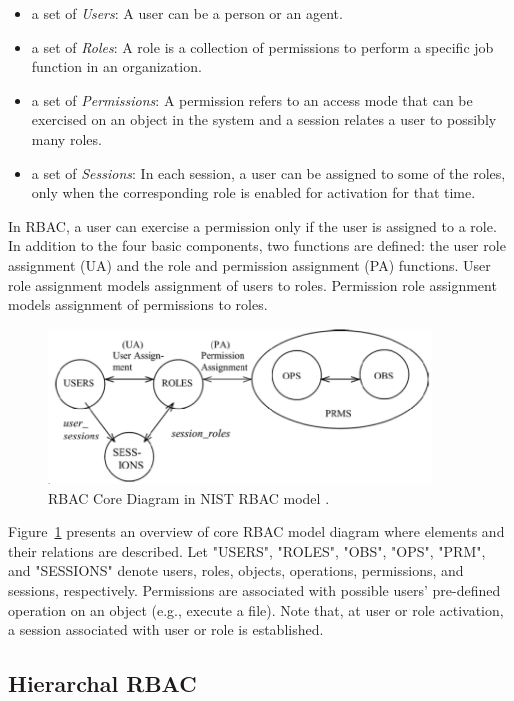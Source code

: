 \begin{itemize}
\setlength{\itemsep}{0.25pt}
\item a set of \emph{Users}: A user can be a person or an agent.
\item a set of \emph{Roles}: A role is a collection of permissions to perform a specific job function in an organization.
\item a set of \emph{Permissions}: A permission refers to an access mode that can be exercised on an object in the system and a session relates a user to possibly many roles.
\item a set of \emph{Sessions}: In each session, a user can be assigned to some of the roles, only when the corresponding role is enabled for activation for that time.		
\end{itemize}

In RBAC, a user can exercise a permission only if the user is assigned to a role.
In addition to the four basic components, two functions are defined:
the user role assignment (UA) and the role and permission assignment (PA) functions.
User role assignment models assignment of users to roles.
Permission role assignment models assignment of permissions to roles.

\begin{figure}[ht]
    \centering
        \includegraphics[width=4.0in]{sections/core-model.png}
    \caption{\label{fig:overview}RBAC Core Diagram in NIST RBAC model \cite{ferraiolokuhn}.}
\end{figure}

Figure~\ref{fig:overview} presents an overview of core RBAC model diagram where elements and their relations are described.
Let "USERS", "ROLES", "OBS", "OPS", "PRM", and "SESSIONS" denote users, roles, objects, operations, permissions, and sessions, respectively.
Permissions are associated with possible users' pre-defined operation on an object (e.g., execute a file).
Note that, at user or role activation, a session associated with user or role is established.

\subsection{Hierarchal RBAC} 

